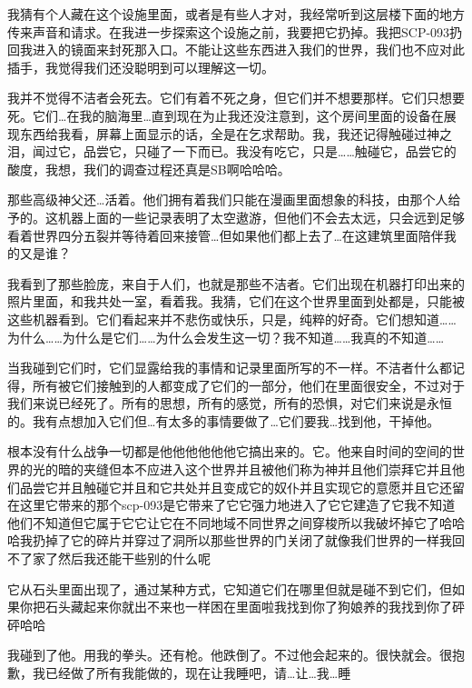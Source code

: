 \begin{scpbox}
我猜有个人藏在这个设施里面，或者是有些人才对，我经常听到这层楼下面的地方传来声音和请求。在我进一步探索这个设施之前，我要把它扔掉。我把SCP-093扔回我进入的镜面来封死那入口。不能让这些东西进入我们的世界，我们也不应对此插手，我觉得我们还没聪明到可以理解这一切。

我并不觉得不洁者会死去。它们有着不死之身，但它们并不想要那样。它们只想要死。它们…在我的脑海里…直到现在为止我还没注意到，这个房间里面的设备在展现东西给我看，屏幕上面显示的话，全是在乞求帮助。我，我还记得触碰过神之泪，闻过它，品尝它，只碰了一下而已。我没有吃它，只是……触碰它，品尝它的酸度，我想，我们的调查过程还真是SB啊哈哈哈。

那些高级神父还…活着。他们拥有着我们只能在漫画里面想象的科技，由那个人给予的。这机器上面的一些记录表明了太空遨游，但他们不会去太远，只会远到足够看着世界四分五裂并等待着回来接管…但如果他们都上去了…在这建筑里面陪伴我的又是谁？

我看到了那些脸庞，来自于人们，也就是那些不洁者。它们出现在机器打印出来的照片里面，和我共处一室，看着我。我猜，它们在这个世界里面到处都是，只能被这些机器看到。它们看起来并不悲伤或快乐，只是，纯粹的好奇。它们想知道……为什么……为什么是它们……为什么会发生这一切？我不知道……我真的不知道……

当我碰到它们时，它们显露给我的事情和记录里面所写的不一样。不洁者什么都记得，所有被它们接触到的人都变成了它们的一部分，他们在里面很安全，不过对于我们来说已经死了。所有的思想，所有的感觉，所有的恐惧，对它们来说是永恒的。我有点想加入它们但…有太多的事情要做了…它们要我…找到他，干掉他。

根本没有什么战争一切都是他他他他他他它搞出来的。它。他来自时间的空间的世界的光的暗的夹缝但本不应进入这个世界并且被他们称为神并且他们崇拜它并且他们品尝它并且触碰它并且和它共处并且变成它的奴仆并且实现它的意愿并且它还留在这里它带来的那个scp-093是它带来了它它强力地进入了它它建造了它我不知道他们不知道但它属于它它让它在不同地域不同世界之间穿梭所以我破坏掉它了哈哈哈我扔掉了它的碎片并穿过了洞所以那些世界的门关闭了就像我们世界的一样我回不了家了然后我还能干些别的什么呢

它从石头里面出现了，通过某种方式，它知道它们在哪里但就是碰不到它们，但如果你把石头藏起来你就出不来也一样困在里面啦我找到你了狗娘养的我找到你了砰砰哈哈

我碰到了他。用我的拳头。还有枪。他跌倒了。不过他会起来的。很快就会。很抱歉，我已经做了所有我能做的，现在让我睡吧，请…让…我…睡

\end{scpbox}
